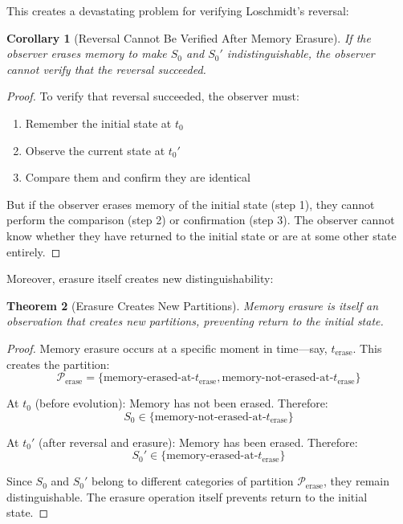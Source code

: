 \documentclass[twocolumn,10pt]{article}
\newtheorem{theorem}{Theorem}[section]
\newtheorem{corollary}[theorem]{Corollary}
\theoremstyle{definition}
\theoremstyle{remark}
\begin{document}
\vspace{0.2cm}
\noindent This creates a devastating problem for verifying Loschmidt's reversal:

\begin{corollary}[Reversal Cannot Be Verified After Memory Erasure]
If the observer erases memory to make $S_0$ and $S_0'$ indistinguishable, the observer cannot verify that the reversal succeeded.
\end{corollary}

\begin{proof}
To verify that reversal succeeded, the observer must:
\begin{enumerate}
\item Remember the initial state at $t_0$
\item Observe the current state at $t_0'$
\item Compare them and confirm they are identical
\end{enumerate}

But if the observer erases memory of the initial state (step 1), they cannot perform the comparison (step 2) or confirmation (step 3). The observer cannot know whether they have returned to the initial state or are at some other state entirely.
\end{proof}

\vspace{0.2cm}
\noindent Moreover, erasure itself creates new distinguishability:

\begin{theorem}[Erasure Creates New Partitions]
\label{thm:erasure_partitions}
Memory erasure is itself an observation that creates new partitions, preventing return to the initial state.
\end{theorem}

\begin{proof}
Memory erasure occurs at a specific moment in time—say, $t_{\text{erase}}$. This creates the partition:
\begin{equation}
\mathcal{P}_{\text{erase}} = \{\text{memory-erased-at-}t_{\text{erase}}, \text{memory-not-erased-at-}t_{\text{erase}}\}
\end{equation}

At $t_0$ (before evolution): Memory has not been erased. Therefore:
\begin{equation}
S_0 \in \{\text{memory-not-erased-at-}t_{\text{erase}}\}
\end{equation}

At $t_0'$ (after reversal and erasure): Memory has been erased. Therefore:
\begin{equation}
S_0' \in \{\text{memory-erased-at-}t_{\text{erase}}\}
\end{equation}

Since $S_0$ and $S_0'$ belong to different categories of partition $\mathcal{P}_{\text{erase}}$, they remain distinguishable. The erasure operation itself prevents return to the initial state.
\end{proof}
\end{document}
